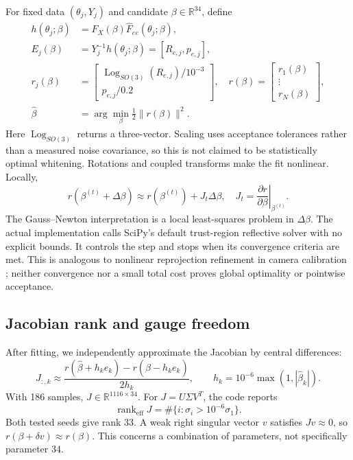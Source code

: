 \documentclass[11pt]{article}
\newcommand{\Log}{\operatorname{Log}}
\newcommand{\R}{\mathbb R}
\begin{document}
For fixed data $(\theta_j,Y_j)$ and candidate $\beta\in\R^{34}$, define
\begin{align}
 h(\theta_j;\beta)&=\widehat F_X(\beta)\widehat F_{ee}(\theta_j;\beta),\\
 E_j(\beta)&=Y_j^{-1}h(\theta_j;\beta)=[R_{e,j},p_{e,j}],\\
 r_j(\beta)&=\begin{bmatrix}\Log_{SO(3)}(R_{e,j})/10^{-3}\\p_{e,j}/0.2\end{bmatrix},\quad
 r(\beta)=\begin{bmatrix}r_1(\beta)\\\vdots\\r_N(\beta)\end{bmatrix},\\
 \widehat\beta&=\arg\min_\beta\frac12\|r(\beta)\|^2.
 \label{eq:objective}
\end{align}
Here $\Log_{SO(3)}$ returns a three-vector. Scaling uses acceptance tolerances rather than a measured noise covariance, so this is not claimed to be statistically optimal whitening. Rotations and coupled transforms make the fit nonlinear. Locally,
\begin{equation}
 r(\beta^{(t)}+\Delta\beta)\approx r(\beta^{(t)})+J_t\Delta\beta,
 \quad J_t=\left.\frac{\partial r}{\partial\beta}\right|_{\beta^{(t)}}.
\end{equation}
The Gauss--Newton interpretation is a local least-squares problem in $\Delta\beta$. The actual implementation calls SciPy's default trust-region reflective solver with no explicit bounds. It controls the step and stops when its convergence criteria are met. This is analogous to nonlinear reprojection refinement in camera calibration \cite{cv}; neither convergence nor a small total cost proves global optimality or pointwise acceptance.

\subsection{Jacobian rank and gauge freedom}
After fitting, we independently approximate the Jacobian by central differences:
\begin{equation}
 J_{:,k}\approx\frac{r(\widehat\beta+h_ke_k)-r(\widehat\beta-h_ke_k)}{2h_k},\qquad
 h_k=10^{-6}\max(1,|\widehat\beta_k|).
\end{equation}
With 186 samples, $J\in\R^{1116\times34}$. For $J=U\Sigma V^T$, the code reports
\begin{equation}
 \operatorname{rank}_{\mathrm{eff}}J=\#\{i:\sigma_i>10^{-6}\sigma_1\}.
\end{equation}
Both tested seeds give rank 33. A weak right singular vector $v$ satisfies $Jv\approx0$, so $r(\beta+\delta v)\approx r(\beta)$. This concerns a combination of parameters, not specifically parameter 34.
\end{document}
